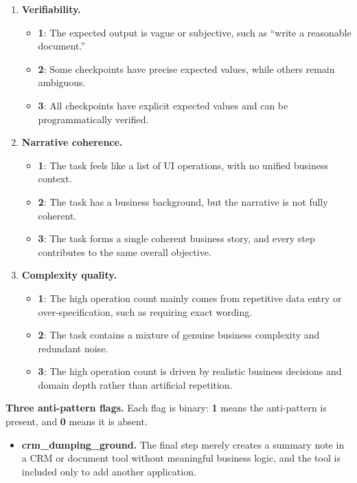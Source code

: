 \begin{tcolorbox}[
    title=Text-only Static Check Rubric,
    colback=gray!3,
    colframe=black!45,
    fonttitle=\bfseries,
    breakable
]
\begin{enumerate}
    \item \textbf{Verifiability.}
    \begin{itemize}
        \item \textbf{1}: The expected output is vague or subjective, such as ``write a reasonable document.''
        \item \textbf{2}: Some checkpoints have precise expected values, while others remain ambiguous.
        \item \textbf{3}: All checkpoints have explicit expected values and can be programmatically verified.
    \end{itemize}

    \item \textbf{Narrative coherence.}
    \begin{itemize}
        \item \textbf{1}: The task feels like a list of UI operations, with no unified business context.
        \item \textbf{2}: The task has a business background, but the narrative is not fully coherent.
        \item \textbf{3}: The task forms a single coherent business story, and every step contributes to the same overall objective.
    \end{itemize}

    \item \textbf{Complexity quality.}
    \begin{itemize}
        \item \textbf{1}: The high operation count mainly comes from repetitive data entry or over-specification, such as requiring exact wording.
        \item \textbf{2}: The task contains a mixture of genuine business complexity and redundant noise.
        \item \textbf{3}: The high operation count is driven by realistic business decisions and domain depth rather than artificial repetition.
    \end{itemize}
\end{enumerate}

\textbf{Three anti-pattern flags.}
Each flag is binary: \textbf{1} means the anti-pattern is present, and \textbf{0} means it is absent.

\begin{itemize}
    \item \textbf{{\ttfamily crm\_dumping\_ground}.}
    The final step merely creates a summary note in a CRM or document tool without meaningful business logic, and the tool is included only to add another application.


\end{itemize}
\end{tcolorbox}
